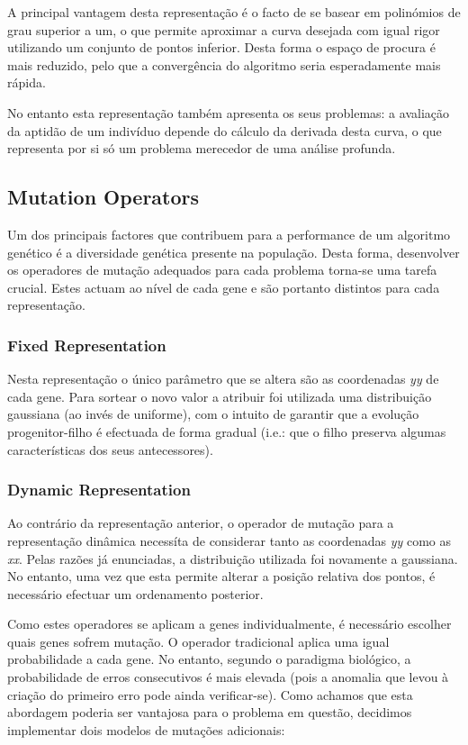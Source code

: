 \documentclass[a4paper]{article}
\begin{document}
\indent A principal vantagem desta representação é o facto de se basear em polinómios de grau superior a um, o que permite aproximar a curva desejada
com igual rigor utilizando um conjunto de pontos inferior. Desta forma o espaço de procura é mais reduzido, pelo que a convergência do algoritmo
seria esperadamente mais rápida.

\indent No entanto esta representação também apresenta os seus problemas: a avaliação da aptidão de um indivíduo depende do cálculo da derivada
desta curva, o que representa por si só um problema merecedor de uma análise profunda. 

\cleardoublepage
\subsection{Mutation Operators}
\indent \indent Um dos principais factores que contribuem para a performance de um algoritmo genético é a diversidade genética presente na população.
Desta forma, desenvolver os operadores de mutação adequados para cada problema torna-se uma tarefa crucial.
Estes actuam ao nível de cada gene e são portanto distintos para cada representação. 

\subsubsection{Fixed Representation}
\indent \indent Nesta representação o único parâmetro que se altera são as coordenadas \emph{yy} de cada gene.
Para sortear o novo valor a atribuir foi utilizada uma distribuição gaussiana (ao invés de uniforme), com o intuito 
de garantir que a evolução progenitor-filho é efectuada de forma gradual (i.e.: que o filho preserva algumas características dos
seus antecessores).

\subsubsection{Dynamic Representation}
\indent \indent Ao contrário da representação anterior, o operador de mutação para a representação dinâmica necessíta de considerar
tanto as coordenadas \emph{yy} como as \emph{xx}. Pelas razões já enunciadas, a distribuição utilizada foi novamente a gaussiana.
No entanto, uma vez que esta permite alterar a posição relativa dos pontos, é necessário efectuar um ordenamento posterior.

\indent Como estes operadores se aplicam a genes individualmente, é necessário escolher quais genes sofrem mutação.
O operador tradicional aplica uma igual probabilidade a cada gene. No entanto, segundo o paradigma biológico,
a probabilidade de erros consecutivos é mais elevada (pois a anomalia que levou à criação do primeiro erro pode ainda verificar-se).
Como achamos que esta abordagem poderia ser vantajosa para o problema em questão, decidimos implementar dois modelos de mutações adicionais:
\end{document}
